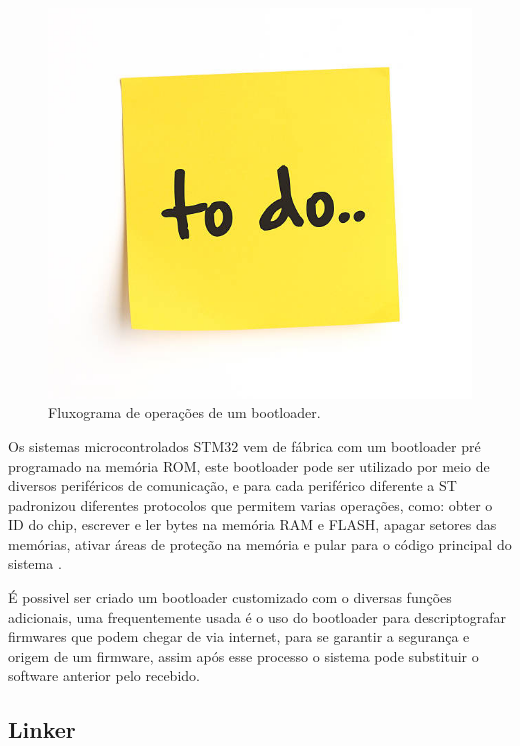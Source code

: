 \begin{figure}[H]
    \scriptsize
     \centering
     \includegraphics[scale=1]{dados/figuras/ToDo.jpg}
     \caption{Fluxograma de operações de um bootloader.}
     \label{FluxoBootloader}
\end{figure}



Os sistemas microcontrolados STM32 vem de fábrica com um bootloader pré programado na memória ROM, este bootloader pode ser utilizado por meio de diversos periféricos de comunicação, e para cada periférico diferente a ST padronizou diferentes protocolos que permitem varias operações, como: obter o ID do chip, escrever e ler bytes na memória RAM e FLASH, apagar setores das memórias, ativar áreas de proteção na memória e pular para o código principal do sistema \cite{Noviello2018}.

É possivel ser criado um bootloader customizado com o diversas funções adicionais, uma frequentemente usada é o uso do bootloader para descriptografar firmwares que podem chegar de via internet, para se garantir a segurança e origem de um firmware, assim após esse processo o sistema pode substituir o software anterior pelo recebido. 



\subsection{Linker}

